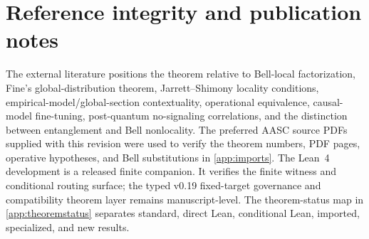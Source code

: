 \documentclass[11pt]{article}
\theoremstyle{definition}
\begin{document}
\section{Reference integrity and publication notes}\label{app:refs}
The external literature positions the theorem relative to Bell-local factorization, Fine's global-distribution theorem, Jarrett--Shimony locality conditions, empirical-model/global-section contextuality, operational equivalence, causal-model fine-tuning, post-quantum no-signaling correlations, and the distinction between entanglement and Bell nonlocality. The preferred AASC source PDFs supplied with this revision were used to verify the theorem numbers, PDF pages, operative hypotheses, and Bell substitutions in \cref{app:imports}. The Lean~4 development is a released finite companion. It verifies the finite witness and conditional routing surface; the typed v0.19 fixed-target governance and compatibility theorem layer remains manuscript-level. The theorem-status map in \cref{app:theoremstatus} separates standard, direct Lean, conditional Lean, imported, specialized, and new results.
\end{document}

